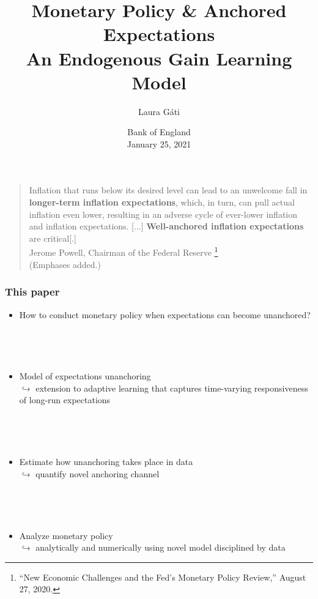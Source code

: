 \documentclass[10pt]{beamer}
\author[]{Laura G\'ati}
\institute[]{Boston College}
\title[]{Monetary Policy \& Anchored Expectations \\
An Endogenous Gain Learning Model}
\date[]{Bank of England \\
\vspace{0.2cm}
January 25, 2021}
\begin{document}
\begin{frame}[plain] %

\maketitle

\end{frame}




\begin{frame}\label{motivation}
	
\begin{quote}
Inflation that runs below its desired level can lead to an unwelcome fall in \textbf{longer-term inflation expectations}, which, in turn, can pull actual inflation even lower, resulting in an adverse cycle of ever-lower inflation and inflation expectations.
[...]  \textbf{Well-anchored inflation expectations} are critical[.]  \\
Jerome Powell, Chairman of the Federal Reserve \footnote{``New Economic Challenges and the Fed's Monetary Policy Review,''  August 27, 2020.} \\
(Emphases added.)
\end{quote}	



\end{frame}






\begin{frame}
	\frametitle{This paper}
	
	\begin{itemize}
	\item How to conduct monetary policy when expectations can become unanchored?
	
	\
	
	\

	\item Model of expectations unanchoring  \\
	$\hookrightarrow$ extension to adaptive learning that captures time-varying responsiveness of long-run expectations
	
	
	\
	
	\
	
	\item Estimate how unanchoring takes place in data \\
	$\hookrightarrow$ quantify novel anchoring channel
	
	\
	
	\
	
	\item Analyze monetary policy \\
	$\hookrightarrow$ analytically and numerically using novel model disciplined by data

	\end{itemize}
	\end{frame}
\end{document}
